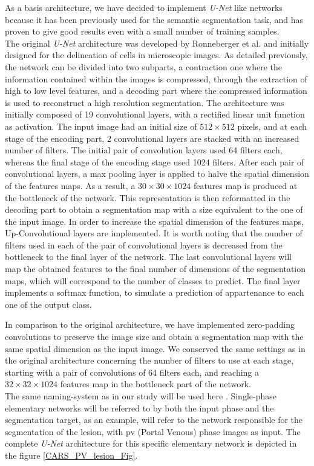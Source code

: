 As a basis architecture, we have decided to implement \emph{U-Net} like
networks because it has been previously used for the semantic
segmentation task, and has proven to give good results even with a
small number of training samples. \\
The original \emph{U-Net} architecture was developed by Ronneberger et
al. \cite{Ronneberger2015} and initially designed for the
delineation of cells in microscopic images. As detailed previously, the
network can be divided into two subparts, a contraction one where the
information contained within the images is compressed, through the
extraction of high to low level features, and a decoding part where the
compressed information is used to reconstruct a high resolution
segmentation. The architecture was initially composed of 19
convolutional layers, with a rectified linear unit function as
activation. The input image had an initial size of $ 512\times512 $ pixels, and
at each stage of the encoding part, 2 convolutional layers are stacked
with an increased number of filters. The initial pair of convolution
layers used 64 filters each, whereas the final stage of the encoding
stage used 1024 filters. After each pair of convolutional layers, a max
pooling layer is applied to halve the spatial dimension of the features
maps. As a result, a $ 30\times30\times1024 $ features map is produced at the
bottleneck of the network. This representation is then reformatted in
the decoding part to obtain a segmentation map with a size equivalent to
the one of the input image. In order to increase the spatial dimension
of the features maps, Up-Convolutional layers are implemented. It is worth
noting that the number of filters used in each of the pair of
convolutional layers is decreased from the bottleneck to the final layer
of the network. The last convolutional layers will map the obtained
features to the final number of dimensions of the segmentation maps,
which will correspond to the number of classes to predict. The final
layer implements a softmax function, to simulate a prediction of
appartenance to each one of the output class.

In comparison to the original architecture, we have implemented
zero-padding convolutions to preserve the image size and obtain a
segmentation map with the same spatial dimension as the input image. We
conserved the same settings as in the original architecture concerning
the number of filters to use at each stage, starting with a pair of
convolutions of 64 filters each, and reaching a $ 32\times32\times1024 $ features map
in the bottleneck part of the network. \\
The same naming-system as in our study will be used
here \cite{Ouhmich2019}. Single-phase elementary networks will be referred to by both the
input phase and the segmentation target, as an example,  will
refer to the network responsible for the segmentation of the lesion,
with \ac{pv} (Portal Venous) phase images as input. The complete \emph{U-Net}
architecture for this specific elementary network is depicted in the figure \ref{CARS_PV_lesion_Fig}.

